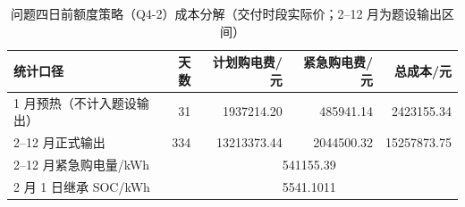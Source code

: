\begin{table}[htbp]
\centering
\caption{问题四日前额度策略（Q4-2）成本分解（交付时段实际价；2--12 月为题设输出区间）}\label{tab:q4-cost-summary}
\normalsize\setlength{\tabcolsep}{6pt}
\begin{tabular}{@{}lrrrr@{}}
\toprule
统计口径 & 天数 & 计划购电费/元 & 紧急购电费/元 & 总成本/元 \\
\midrule
1 月预热（不计入题设输出） & 31 & 1937214.20 & 485941.14 & 2423155.34 \\
2--12 月正式输出 & 334 & 13213373.44 & 2044500.32 & 15257873.75 \\
\midrule
2--12 月紧急购电量/kWh & \multicolumn{4}{c}{541155.39} \\
2 月 1 日继承 SOC/kWh & \multicolumn{4}{c}{5541.1011} \\
\bottomrule
\end{tabular}
\end{table}
